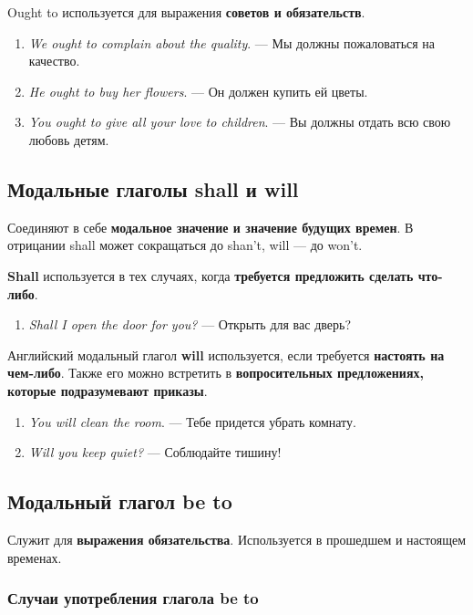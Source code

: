 \documentclass{article}
\begin{document}
Ought to используется для выражения \textbf{советов и обязательств}. 

\begin{enumerate}
	\item \emph{We ought to complain about the quality}. — Мы должны пожаловаться на качество. 
	\item \emph{He ought to buy her flowers}. — Он должен купить ей цветы. 
	\item \emph{You ought to give all your love to children}. — Вы должны отдать всю свою любовь детям. 
\end{enumerate}

\subsection{Модальные глаголы \textbf{shall} и \textbf{will}}

Соединяют в себе \textbf{модальное значение и значение будущих времен}. В отрицании shall может сокращаться до shan’t, will — до won’t.

\textbf{Shall} используется в тех случаях, когда \textbf{требуется предложить сделать что-либо}.

\begin{enumerate}
 	\item \emph{Shall I open the door for you?} — Открыть для вас дверь? 
\end{enumerate} 

Английский модальный глагол \textbf{will} используется, если требуется \textbf{настоять на чем-либо}. Также его можно встретить в \textbf{вопросительных предложениях, которые подразумевают приказы}.

\begin{enumerate}
	\item \emph{You will clean the room}. — Тебе придется убрать комнату. 
	\item \emph{Will you keep quiet?} — Соблюдайте тишину! 
\end{enumerate}

\subsection{Модальный глагол \textbf{be to}}

Служит для \textbf{выражения обязательства}. Используется в прошедшем и настоящем временах. 

\subsubsection{Случаи употребления глагола be to}
\end{document}
